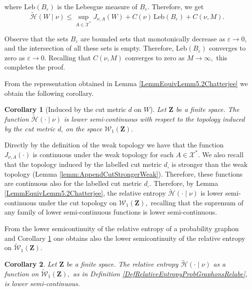 \documentclass[12pt,twoside,a4paper]{article}
\newtheorem{corollary}{Corollary}[theorem]
\newcommand{\Space}{\mathbf{Z}}
\newcommand{\Graphon}{\mathcal{W}_1}
\newcommand{\UGraphon}{\widetilde{\mathcal{W}}_1}
\newcommand{\Ugo}{\mathcal{X}^*}
\begin{document}
where $\text{Leb}(B_{\varepsilon})$ is the Lebesgue measure of $B_{\varepsilon}$. Therefore, we get
\[
\widetilde{\mathcal{H}}(W \mid \nu)\leq \sup_{A \in \Ugo} J_{\nu,A}( W) + C(\nu) \, \text{Leb}(B_{\varepsilon}) + C(\nu, M).
\]


Observe that the sets $B_{\varepsilon}$ are bounded sets that monotonically decrease as $\varepsilon \to 0$, and the intersection of all these sets is empty. Therefore, $\text{Leb}(B_{\varepsilon})$ converges to zero as $\varepsilon\to 0$. Recalling that $C(\nu, M)$ converges to zero as $M \to \infty,$ this completes the proof. 
\endproof



From the representation obtained in Lemma \ref{LemmEquivLemm5.2Chatterjee} we obtain the following corollary.

\begin{corollary}[Induced by the cut metric $d$ on $W$]\label{Cor:LowSemicontRelEnt}
Let $\Space$ be a finite space. The function $\widetilde{\mathcal{H}}(\cdot \mid \nu)$ is lower semi-continuous with respect to the topology induced by the cut metric $d_{\square}$ on the space $\Graphon(\Space).$
\end{corollary}

\proof
Directly by the definition of the weak topology we have that the function $J_{\nu,A}(\cdot)$ is continuous under the weak topology for each $A\in \Ugo.$ We also recall that the topology induced by the labelled cut metric $d_{\square}$ is stronger than the weak topology (Lemma \ref{lemm:AppendCutStrongerWeak}). Therefore, these functions are continuous also for the labelled cut metric $d_{\square}.$ Therefore, by Lemma \ref{LemmEquivLemm5.2Chatterjee}, the relative entropy $\widetilde{\mathcal{H}}(\cdot \mid \nu)$ is lower semi-continuous under the cut topology on $\Graphon(\Space),$ recalling that the supremum of any family of lower semi-continuous functions is lower semi-continuous. 
\endproof

From the lower semicontinuity of the relative entropy of a probability graphon and Corollary \ref{Cor:LowSemicontRelEnt} one obtains also the lower semicontinuity of the relative entropy on $\UGraphon(\Space).$ 

\begin{corollary}\label{cor:LowSemicontUGraphon}
Let $\Space$ be a finite space. The relative entropy $\widetilde{\mathcal{H}}(\cdot \mid \nu)$ as a function on $\UGraphon(\Space),$ as in Definition \ref{DefRelativeEntropyProbGraphonsRelabe}, is lower semi-continuous.
\end{corollary}
\end{document}
